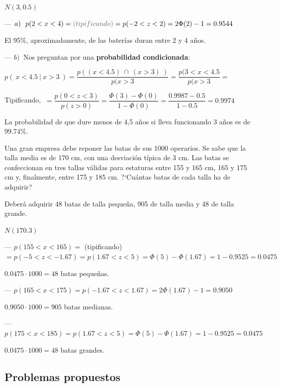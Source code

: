 $N(3,0.5)$

--- $a) \ \ p(2<x<4)=\textcolor{gris}{(tipificando)}=p(-2<z<2)=2\Phi(2)-1=0.9544$

El 95\%, aproximadamente, de las baterías duran entre 2 y 4 años.

--- $b)\ $ Nos preguntan por una \textbf{probabilidad condicionada}:

$p(\ x<4.5\ | \ x>3\ )= \dfrac{p \left( (x<4.5) \ \cap \ (x>3) \ \right) }{p(x>3}=\dfrac{p(3<x<4.5}{p(x>3} = $

Tipificando, $\ = \dfrac{p(0<z<3)}{p(z>0)}=\dfrac{\Phi(3)-\Phi(0)}{1-\Phi(0)}=\dfrac{0.9987-0.5}{1-0.5}=0.9974$

La probabilidad de que dure menos de 4,5 años si lleva funcionando 3 años es de 99.74\%.


\vspace{4mm}
\begin{ejemplo}
\begin{ejer}
Una gran empresa debe reponer las batas de sus 1000 operarios. Se sabe que la talla media es de 170 cm, con una desviación típica de 3 cm. Las batas se confeccionan en tres tallas válidas para estaturas entre 155 y 165 cm, 165 y 175 cm y, finalmente, entre 175 y 185 cm. ?`Cuántas batas de cada talla ha de adquirir?

 Deberá adquirir 48 batas de talla pequeña, 905 de talla media y 48 de talla grande.
\end{ejer}
\end{ejemplo}

$N(170.3)$

--- $p(155<x<165)=$ \textcolor{gris}{(tipificando)} $=p(-5<z<-1.67)=p(1.67<z<5)=\Phi(5)-\Phi(1.67)=1-0.9525=0.0475$

$0.0475 \cdot 1000 = 48 $ batas pequeñas.

--- $p(165<x<175)=p(-1.67 <z<1.67)=2\Phi(1.67)-1=0.9050$

$0.9050 \cdot 1000 = 905$ batas medianas.

--- $p(175<x<185)=p(1.67<z<5)=\Phi(5)-\Phi(1.67)=1-0.9525=0.0475$

$0.0475 \cdot 1000 = 48 $ batas grandes.

\subsection{Problemas propuestos}

